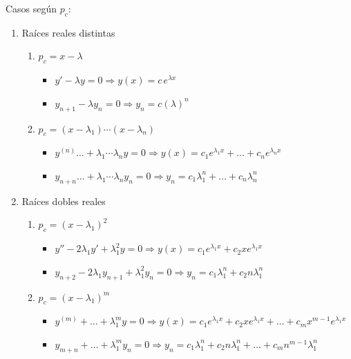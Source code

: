 Casos según $p_c$:
\begin{enumerate}
    \item Raíces reales distintas
    \begin{enumerate}[noitemsep]
        \item $p_c = x-\lambda $
        \begin{itemize}[noitemsep]
            \item $y'-\lambda y = 0 \Rightarrow y(x) = c \, e^{\lambda x}$
            \item $y_{n+1}-\lambda y_n = 0 \Rightarrow y_n = c(\lambda)^n$
        \end{itemize}
        \item $p_c = (x-\lambda_1)\cdots(x-\lambda_n)$
        \begin{itemize}
            \item $y^{(n)} \dots + \lambda_1\cdots\lambda_n y = 0 \Rightarrow y(x) = c_1 e^{\lambda_1 x} + \dots + c_n e^{\lambda_n x}$
            \item $y_{n+n} \dots + \lambda_1\cdots\lambda_n y_n = 0 \Rightarrow y_n = c_1 \lambda_1^n + \dots + c_n \lambda_n^n$
        \end{itemize}
    \end{enumerate}
    \item Raíces dobles reales
    \begin{enumerate}[noitemsep]
        \item $p_c = (x-\lambda_1)^2$
        \begin{itemize}[noitemsep]
            \item $y''-2\lambda_1 y' + \lambda_1^2 y = 0 \Rightarrow y(x) = c_1 e^{\lambda_1 x} + c_2 x e^{\lambda_1 x}$
            \item  $y_{n+2}-2\lambda_1 y_{n+1} + \lambda_1^2 y_n = 0 \Rightarrow y_n = c_1 \lambda_1^n + c_2 n \lambda_1^n$
        \end{itemize}
        \item $p_c = (x-\lambda_1)^m $ 
        \begin{itemize}[noitemsep]
            \item $y^{(m)} + \dots + \lambda_1^m y = 0 \Rightarrow y(x) = c_1 e^{\lambda_1 x} + c_2 x e^{\lambda_1 x} + \dots + c_m x^{m-1} e^{\lambda_1 x}$
            \item $y_{m+n} +\dots + \lambda_1^m y_n = 0 \Rightarrow y_n = c_1 \lambda_1^n + c_2 n \lambda_1^n + \dots + c_m n^{m-1} \lambda_1^n$
        \end{itemize}
    \end{enumerate}

\end{enumerate}
